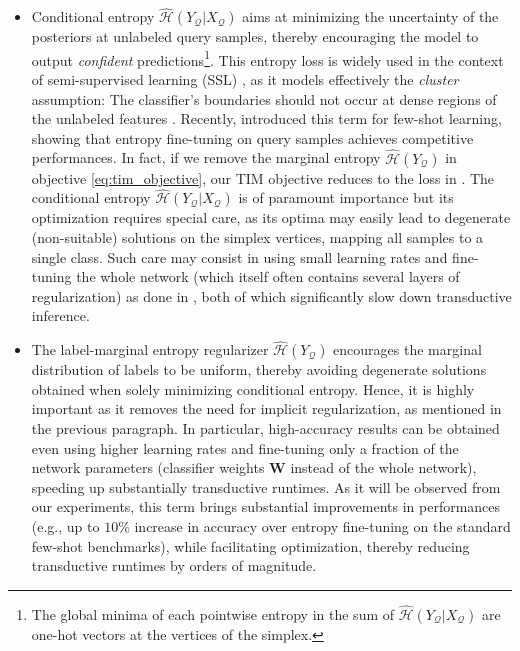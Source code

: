 \documentclass{article}
\begin{document}
    	\begin{itemize}[leftmargin=*]
    	    \item Conditional entropy $\mathcal{\widehat{H}}(Y_\mathcal{Q}|X_\mathcal{Q})$ aims at minimizing the uncertainty of the posteriors at unlabeled query samples, thereby encouraging the model to output {\em confident} predictions\footnote{The global minima of each pointwise entropy in the sum of $\mathcal{\widehat{H}}(Y_\mathcal{Q}|X_\mathcal{Q})$ are one-hot vectors at the vertices of the simplex.}. This entropy loss is widely used in the context of semi-supervised learning (SSL) \cite{grandvalet2005semi,miyato2018virtual,berthelot2019mixmatch}, as it models effectively the {\em cluster} assumption: The classifier's boundaries should not occur at dense regions of the unlabeled features \cite{grandvalet2005semi}. Recently, \cite{dhillon2019baseline} introduced this term for few-shot learning, showing that entropy fine-tuning on query samples achieves competitive performances. In fact, if we remove the marginal entropy $\widehat{\mathcal{H}}(Y_\mathcal{Q})$ in objective \eqref{eq:tim_objective}, our TIM objective reduces to the loss in \cite{dhillon2019baseline}. The conditional entropy $\widehat{\mathcal{H}}(Y_\mathcal{Q}|X_\mathcal{Q})$ is of paramount importance but its optimization  requires special care, as its optima may easily lead to degenerate (non-suitable) solutions on the simplex vertices, mapping all samples to a single class. Such care may consist in using small learning rates and fine-tuning the whole network (which itself often contains several layers of regularization) as done in \cite{dhillon2019baseline}, both of which significantly slow down transductive inference.
    	    
    	    \item The label-marginal entropy regularizer $\widehat{\mathcal{H}}(Y_\mathcal{Q})$ encourages the marginal distribution of labels to be uniform, thereby avoiding degenerate solutions obtained when solely minimizing conditional entropy. Hence, it is highly important as it removes the need for implicit regularization, as mentioned in the previous paragraph. In particular, high-accuracy results can be obtained even using higher learning rates and fine-tuning only a fraction of the network parameters (classifier weights $\mathbf{W}$ instead of the whole network), speeding up substantially transductive runtimes. As it will be observed from our experiments, this term brings substantial improvements in performances (e.g., up to $10\%$ increase in accuracy over entropy fine-tuning on the standard few-shot benchmarks), while facilitating optimization, thereby reducing transductive runtimes by orders of magnitude.



    	   
\end{itemize}
        	
\end{document}
